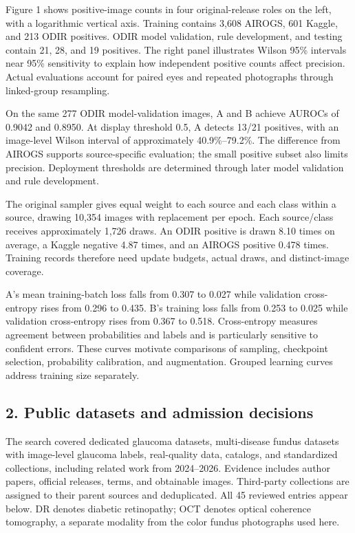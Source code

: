 \documentclass[
  10pt,
]{article}
\begin{document}
Figure 1 shows positive-image counts in four original-release roles on
the left, with a logarithmic vertical axis. Training contains 3,608
AIROGS, 601 Kaggle, and 213 ODIR positives. ODIR model validation, rule
development, and testing contain 21, 28, and 19 positives. The right
panel illustrates Wilson 95\% intervals near 95\% sensitivity to explain
how independent positive counts affect precision. Actual evaluations
account for paired eyes and repeated photographs through linked-group
resampling.

On the same 277 ODIR model-validation images, A and B achieve AUROCs of
0.9042 and 0.8950. At display threshold 0.5, A detects 13/21 positives,
with an image-level Wilson interval of approximately 40.9\%--79.2\%. The
difference from AIROGS supports source-specific evaluation; the small
positive subset also limits precision. Deployment thresholds are
determined through later model validation and rule development.

The original sampler gives equal weight to each source and each class
within a source, drawing 10,354 images with replacement per epoch. Each
source/class receives approximately 1,726 draws. An ODIR positive is
drawn 8.10 times on average, a Kaggle negative 4.87 times, and an AIROGS
positive 0.478 times. Training records therefore need update budgets,
actual draws, and distinct-image coverage.

A's mean training-batch loss falls from 0.307 to 0.027 while validation
cross-entropy rises from 0.296 to 0.435. B's training loss falls from
0.253 to 0.025 while validation cross-entropy rises from 0.367 to 0.518.
Cross-entropy measures agreement between probabilities and labels and is
particularly sensitive to confident errors. These curves motivate
comparisons of sampling, checkpoint selection, probability calibration,
and augmentation. Grouped learning curves address training size
separately.

\subsection{2. Public datasets and admission
decisions}\label{public-datasets-and-admission-decisions}

The search covered dedicated glaucoma datasets, multi-disease fundus
datasets with image-level glaucoma labels, real-quality data, catalogs,
and standardized collections, including related work from 2024--2026.
Evidence includes author papers, official releases, terms, and
obtainable images. Third-party collections are assigned to their parent
sources and deduplicated. All 45 reviewed entries appear below. DR
denotes diabetic retinopathy; OCT denotes optical coherence tomography,
a separate modality from the color fundus photographs used here.
\end{document}
